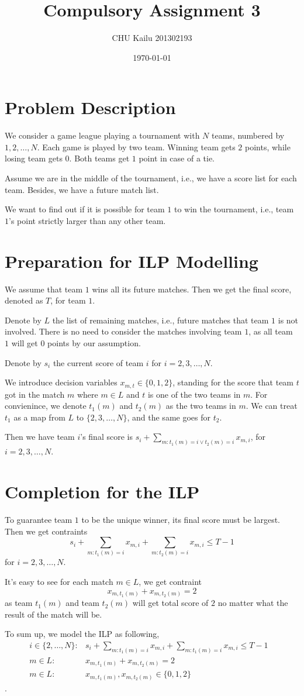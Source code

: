 \documentclass[10pt]{article}
\title{Compulsory Assignment 3}
\author{CHU Kailu 201302193}
\date{\today}
\begin{document}
\maketitle

\section{Problem Description}
We consider a game league playing a tournament with $N$ teams, 
numbered by $1,2,\dots,N$.
Each game is played by two team. 
Winning team gets $2$ points, while losing team gets $0$. 
Both teams get $1$ point in case of a tie.

Assume we are in the middle of the tournament, i.e., 
we have a score list for each team.
Besides, we have a future match list.

We want to find out if it is possible for team $1$ to win the tournament,
i.e., team $1$'s point strictly larger than any other team.

\section{Preparation for ILP Modelling}
We assume that team $1$ wins all its future matches. 
Then we get the final score, denoted as $T$, for team $1$.

Denote by $L$ the list of remaining matches, i.e., 
future matches that team $1$ is not involved.
There is no need to consider the matches involving team $1$,
as all team $1$ will get $0$ points by our assumption.

Denote by $s_i$ the current score of team $i$ for $i=2,3,\dots,N$.

We introduce decision variables $x_{m,t} \in \{0,1,2\}$, 
standing for the score that team $t$ got in the match $m$
where $m \in L$ and $t$ is one of the two teams in $m$.
For convienince, we denote $t_1(m)$ and $t_2(m)$ as the two teams in $m$.
We can treat $t_1$ as a map from $L$ to $\{2,3,\dots,N\}$, 
and the same goes for $t_2$.

Then we have team $i$'s final score is 
$s_i+ \sum_{m: t_1(m)=i \vee t_2(m)=i} x_{m,i}$, for $i = 2,3,\dots,N$.

\section{Completion for the ILP}
To guarantee team $1$ to be the unique winner, its final score must be largest.
Then we get contraints
\[
  s_i+ \sum_{m: t_1(m)=i}x_{m,i} + \sum_{m: t_2(m)=i}x_{m,i} \leq T-1
\]
for $i = 2,3,\dots,N$.

It's easy to see for each match $m \in L$, we get contraint
\[
  x_{m,t_1(m)} + x_{m,t_2(m)} = 2
\]
as team $t_1(m)$ and team $t_2(m)$ will get total score of $2$
no matter what the result of the match will be.

To sum up, we model the ILP as following,
\begin{align*}
  i \in \{2,\dots,N\}: & s_i+ \sum_{m:t_1(m)=i}x_{m,i} +
  \sum_{m:t_1(m)=i}x_{m,i} \leq T-1 & \\
  m \in L: & x_{m,t_1(m)} + x_{m,t_2(m)} = 2 & \\
  m \in L: & x_{m,t_1(m)},x_{m,t_2(m)} \in \{0,1,2\} &
\end{align*}.
\end{document}
